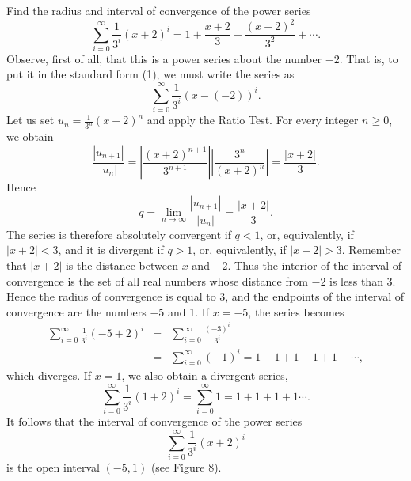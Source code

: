 \begin{example} Find the radius and interval of convergence of the power series
$$
\sum_{i=0}^\infty \frac{1}{3^i} (x + 2)^i = 1 + \frac{x + 2}{3} + \frac{(x + 2)^2}{3^2} + \cdots .
$$
\noindent Observe, first of all, that this is a power series about the number $-2$. That is, to put it in the standard form (1), we must write the series as
$$
\sum_{i=0}^\infty \frac{1}{3^i} (x - (-2))^i .
$$
\noindent Let us set $u_n = \frac{1}{3^n} (x + 2)^n$ and apply the Ratio Test. For every integer $n \geq 0$, we obtain
$$
\frac{|u_{n+1}|}{|u_n|} = |\frac{(x + 2)^{n+1}}{3^{n+1}}| |\frac{3^n}{(x + 2)^n}| = \frac{|x + 2|}{3} .
$$
\noindent Hence
$$
q = \lim_{n \rightarrow \infty} \frac{|u_{n+1}|}{|u_n|} = \frac{|x + 2|}{3} .
$$
\noindent The series is therefore absolutely convergent if $q < 1$, or, equivalently, if $|x + 2| < 3$, and it is divergent if $q > 1$, or, equivalently, if $|x + 2| > 3$. Remember that $|x + 2|$ is the distance between $x$ and $-2$. Thus the interior of the interval of convergence is the set of all real numbers
whose distance from $-2$ is less than 3. Hence the radius of convergence is equal to 3, and the endpoints of the interval of convergence are the numbers $-5$ and 1. If $x = - 5$, the series becomes
 \begin{eqnarray*}
\sum_{i=0}^\infty \frac{1}{3^i} (-5+2)^i 
             &=& \sum_{i=0}^\infty \frac{(-3)^i}{3^i} \\
             &=& \sum_{i=0}^\infty(-1)^i = 1 - 1 + 1 - 1 + 1 - \cdots ,
\end{eqnarray*}
\noindent which diverges. If $x = 1$, we also obtain a divergent series,
$$
\sum_{i=0}^\infty \frac{1}{3^i} (1 + 2)^i =  \sum_{i=0}^\infty 1 = 1 + 1 + 1 + 1 \cdots .
$$
\noindent It follows that the interval of convergence of the power series
$$
\sum_{i=0}^\infty \frac{1}{3^i}(x+2)^i
$$
\noindent is the open interval $(-5, 1)$ (see Figure 8).
\end{example}


